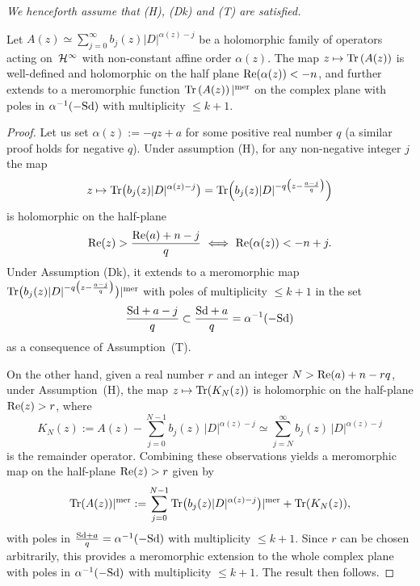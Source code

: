 {\it  We henceforth assume that  {\rm (H)},    {\rm (Dk)} and {\rm (T)} are satisfied.}

\begin{proposition}\label{prop:merAz} Let $A(z)\simeq
    \sum\limits_{j=0}^\infty
b_j(z) \vert D\vert^{\alpha(z)-j} $ be a holomorphic
family of operators acting on~${\cal H}^\infty$ with non-constant affine order
  $\alpha(z)$.
The map
$z\mapsto  {\rm Tr} \left( A(z)\right)$ is well-defined and holomorphic on the
half plane ${\rm Re}(\alpha(z))< -n$,  and further extends to a meromorphic
 function ${\rm Tr} \left( A(z)\right)\vert^{\rm mer}$ on
the complex plane with  poles in $\alpha^{-1}(-{\rm Sd})$ with multiplicity $\leq k+1$.
\end{proposition}

\begin{proof} Let us set $\alpha(z):= -qz+a$ for some positive real
number $q$ (a similar proof holds for negative $q$). Under assumption (H), for any non-negative integer $j$ the map
\[
 z\mapsto {\rm Tr}\big(b_j(z) \vert
  D\vert^{\alpha(z)-j}\big)= {\rm Tr}\Big(b_j(z) \vert
  D\vert^{-q \big(z-\frac{a-j}{q} \big)}\Big)
  \] is holomorphic on the
   half-plane
   \[
   {\rm Re}(z)>\frac{{\rm Re}(a)+n-j}{q} \ \Longleftrightarrow \
    {\rm Re}(\alpha(z))<-n+j.
    \]
     Under Assumption (Dk), it extends to a meromorphic map $ {\rm Tr}\big(b_j(z) \vert
  D\vert^{-q \big(z-\frac{a-j}{q}\big)}\big)\vert^{\rm mer}$
  with poles of multiplicity $\leq k+1$  in the set \[
  \frac{{\rm Sd}+a-j}{q}\subset\frac{{\rm Sd}+a}{q}= \alpha^{-1 }(-{\rm Sd})
  \] as a consequence of Assumption~(T).

 On the other hand,   given a real number $r$ and an integer $N> {\rm Re}(a)+n-rq$, under Assumption~(H),  the map  $z\mapsto {\rm Tr}(K_N(z))$ is holomorphic on the half-plane ${\rm Re}(z)>r$, where
\[
K_N(z):= A(z)-\sum_{j=0}^{N-1}b_j(z)\, \vert D\vert^{\alpha(z)-j}\simeq
\sum_{j=N}^{\infty}b_j(z)\, \vert D\vert^{\alpha(z)-j}
\] is  the remainder
operator.  Combining these observations yields a meromorphic map on the
half-plane
 ${\rm Re}(z)>r$ given by
\[
{\rm Tr} ( A(z))\vert^{\rm mer}:=  \sum_{j=0}^{N-1}
{\rm Tr} \big(b_j(z) \vert D\vert^{\alpha(z)-j}\big)\vert^{\rm mer}+ {\rm
  Tr}(K_N(z)),
   \]
   with poles in $\frac{{\rm Sd}+a}{q}= \alpha^{-1 }(-{\rm Sd})$ with multiplicity $\leq k+1$. Since $r$ can be chosen arbitrarily, this provides a meromorphic extension to the whole complex plane with poles in $\alpha^{-1 }(-{\rm Sd})$ with multiplicity $\leq k+1$. The result then
 follows. \end{proof}

